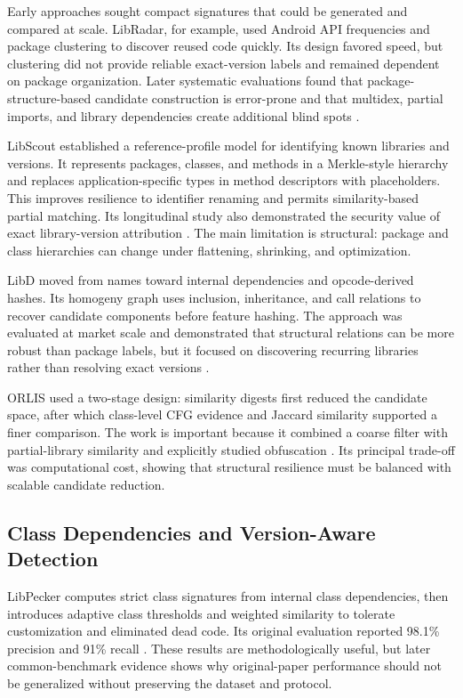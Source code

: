 Early approaches sought compact signatures that could be generated and
compared at scale. LibRadar, for example, used Android API frequencies and
package clustering to discover reused code quickly. Its design favored speed,
but clustering did not provide reliable exact-version labels and remained
dependent on package organization. Later systematic evaluations found that
package-structure-based candidate construction is error-prone and that
multidex, partial imports, and library dependencies create additional blind
spots \cite{zhan2020assessment,zhan2021systematic}.

LibScout established a reference-profile model for identifying known
libraries and versions. It represents packages, classes, and methods in a
Merkle-style hierarchy and replaces application-specific types in method
descriptors with placeholders. This improves resilience to identifier
renaming and permits similarity-based partial matching. Its longitudinal
study also demonstrated the security value of exact library-version
attribution \cite{backes2016libscout}. The main limitation is structural:
package and class hierarchies can change under flattening, shrinking, and
optimization.

LibD moved from names toward internal dependencies and opcode-derived hashes.
Its homogeny graph uses inclusion, inheritance, and call relations to recover
candidate components before feature hashing. The approach was evaluated at
market scale and demonstrated that structural relations can be more robust
than package labels, but it focused on discovering recurring libraries rather
than resolving exact versions \cite{li2017libd}.

ORLIS used a two-stage design: similarity digests first reduced the candidate
space, after which class-level CFG evidence and Jaccard similarity supported a
finer comparison. The work is important because it combined a coarse filter
with partial-library similarity and explicitly studied obfuscation
\cite{wang2018orlis}. Its principal trade-off was computational cost, showing
that structural resilience must be balanced with scalable candidate
reduction.

\subsection{Class Dependencies and Version-Aware Detection}

LibPecker computes strict class signatures from internal class dependencies,
then introduces adaptive class thresholds and weighted similarity to tolerate
customization and eliminated dead code. Its original evaluation reported
98.1\% precision and 91\% recall \cite{zhang2018libpecker}. These results are
methodologically useful, but later common-benchmark evidence shows why
original-paper performance should not be generalized without preserving the
dataset and protocol.

